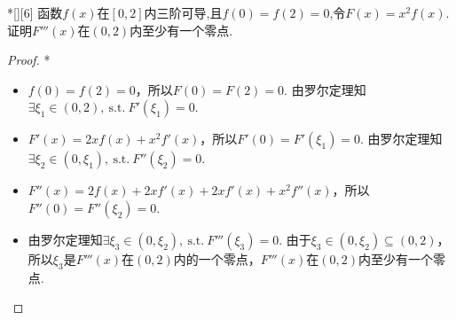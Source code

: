 \begin{problem}*[][6]
    函数$f(x)$在$[0,2]$内三阶可导,且$f(0)=f(2)=0$,令$F(x)=x^2f(x)$. 证明$F'''(x)$在$(0,2)$内至少有一个零点.
\end{problem}
\begin{solution}
\begin{proof}*
\begin{itemize}
    \item $f(0)=f(2)=0$，所以$F(0)=F(2)=0$. 由罗尔定理知$\exists\xi_1\in(0,2),\ \text{s.t.}\ F'(\xi_1)=0$.
    \item $F'(x)=2xf(x)+x^2f'(x)$，所以$F'(0)=F'(\xi_1)=0$. 由罗尔定理知$\exists\xi_2\in(0,\xi_1),\ \text{s.t.}\ F''(\xi_2)=0$.
    \item $F''(x)=2f(x)+2xf'(x)+2xf'(x)+x^2f''(x)$，所以$F''(0)=F''(\xi_2)=0$.
    \item 由罗尔定理知$\exists\xi_3\in(0,\xi_2),\ \text{s.t.}\ F'''(\xi_3)=0$. 由于$\xi_3\in(0,\xi_2)\subseteq(0,2)$，所以$\xi_3$是$F'''(x)$在$(0,2)$内的一个零点，$F'''(x)$在$(0,2)$内至少有一个零点.\QED
\end{itemize}
\end{proof}
\end{solution}


\vfill
{}